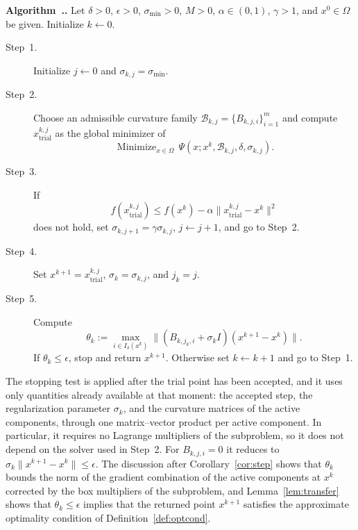 \documentclass[11pt]{article}
\newcommand{\xkjtrial}{x^{k,j}_{\mathrm{trial}}}
\newcommand{\minimize}{\mathop{\text{Minimize}}}
\newcounter{alg}[section]
\renewcommand{\thealg}{\thesection.\arabic{alg}}
\begin{document}
\medskip
\noindent{}\label{alg:main}\textbf{Algorithm~\thealg.} Let $\delta > 0$,
$\epsilon > 0$, $\sigma_{\min} > 0$, $M > 0$, $\alpha \in (0,1)$, $\gamma > 1$, and
$x^0 \in \Omega$ be given. Initialize $k \leftarrow 0$.
\begin{description}
\item[Step~1.] Initialize $j \leftarrow 0$ and $\sigma_{k,j} = \sigma_{\min}$.
\item[Step~2.] Choose an admissible curvature family
$\mathcal{B}_{k,j} = \{B_{k,j,i}\}_{i=1}^{m}$ and compute
$\xkjtrial$ as the global minimizer of
    \begin{equation} \label{ovo-subpro}
    \minimize_{x \in \Omega}\, \Psi(x; x^k, \mathcal{B}_{k,j}, \delta, \sigma_{k,j}).
    \end{equation}
\item[Step~3.] If
    \begin{equation} \label{ovo-armijo}
    f(\xkjtrial) \leq f(x^k) - \alpha \|\xkjtrial - x^k\|^2
    \end{equation}
does not hold, set $\sigma_{k,j+1} = \gamma \sigma_{k,j}$,
$j \leftarrow j + 1$, and go to Step~2.
\item[Step~4.] Set $x^{k+1} = \xkjtrial$, $\sigma_k = \sigma_{k,j}$,
and $j_k = j$.
\item[Step~5.] Compute
    \begin{equation} \label{theta}
    \theta_k := \max_{i \in I_\delta(x^k)}
    \big\| (B_{k,j_k,i} + \sigma_k I)(x^{k+1} - x^k) \big\|.
    \end{equation}
If $\theta_k \leq \epsilon$, stop and return $x^{k+1}$. Otherwise set
$k \leftarrow k+1$ and go to Step~1.
\end{description}

The stopping test is applied after the trial point has been accepted, and it
uses only quantities already available at that moment: the accepted step, the
regularization parameter $\sigma_k$, and the curvature matrices of the active
components, through one matrix--vector product per active component. In
particular, it requires no
Lagrange multipliers of the subproblem, so it does not depend on the solver used
in Step~2. For $B_{k,j,i} = 0$ it reduces to $\sigma_k\|x^{k+1} - x^k\| \leq
\epsilon$. The discussion after Corollary~\ref{cor:step} shows that $\theta_k$
bounds the norm of the gradient combination of the active components at $x^k$ corrected by the
box multipliers of the subproblem, and Lemma~\ref{lem:transfer} shows that
$\theta_k \leq \epsilon$ implies that the returned point $x^{k+1}$ satisfies the
approximate optimality condition of Definition~\ref{def:optcond}.
\end{document}
